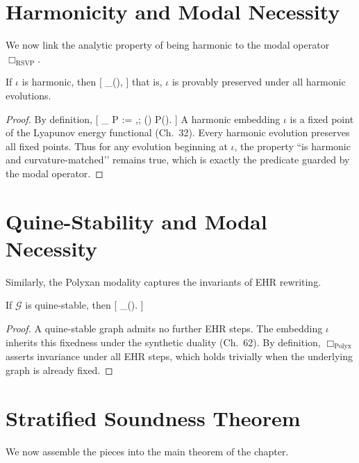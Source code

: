 \section{Harmonicity and Modal Necessity}

We now link the analytic property of being harmonic to the modal operator $\Box_{\mathrm{RSVP}}$.

\begin{lemma}
If $\iota$ is harmonic, then
[
\Box_{}(\iota),
]
that is, $\iota$ is provably preserved under all harmonic evolutions.
\end{lemma}

\begin{proof}
By definition,
[
\Box_{} P
:= \forall \phi,; (\phi) \to P(\phi).
]
A harmonic embedding $\iota$ is a fixed point of the Lyapunov energy functional (Ch.~32).
Every harmonic evolution preserves all fixed points.
Thus for any evolution beginning at $\iota$, the property “is harmonic and curvature-matched’’ remains true, which is exactly the predicate guarded by the modal operator.
\end{proof}

\section{Quine-Stability and Modal Necessity}

Similarly, the Polyxan modality captures the invariants of EHR rewriting.

\begin{lemma}
If $\mathcal{G}$ is quine-stable, then
[
\Box_{}(\iota).
]
\end{lemma}

\begin{proof}
A quine-stable graph admits no further EHR steps.
The embedding $\iota$ inherits this fixedness under the synthetic duality (Ch.~62).
By definition, $\Box_{\mathrm{Polyx}}$ asserts invariance under all EHR steps, which holds trivially when the underlying graph is already fixed.
\end{proof}

\section{Stratified Soundness Theorem}

We now assemble the pieces into the main theorem of the chapter.

